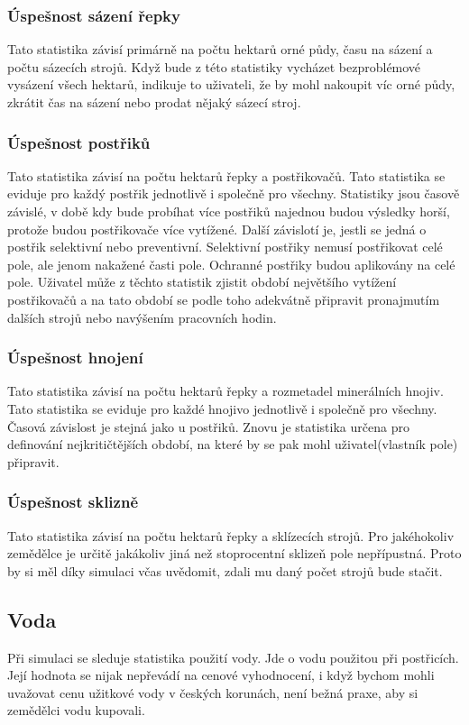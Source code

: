 \documentclass[11pt,a4paper,titlepage]{article}
\begin{document}
\subsubsection{Úspešnost sázení řepky}
Tato statistika závisí primárně na počtu hektarů orné půdy, času na sázení a počtu sázecích strojů. Když bude z této statistiky vycházet bezproblémové vysázení všech hektarů, indikuje to uživateli, že by mohl nakoupit víc orné půdy, zkrátit čas na sázení nebo prodat nějaký sázecí stroj.
\subsubsection{Úspešnost postřiků}
Tato statistika závisí na počtu hektarů řepky a postřikovačů. Tato statistika se eviduje pro každý postřik jednotlivě i společně pro všechny. Statistiky jsou časově závislé, v době kdy bude probíhat více postřiků najednou budou výsledky horší, protože budou postřikovače více vytížené. Další závislotí je, jestli se jedná o postřik selektivní nebo preventivní. Selektivní postřiky nemusí postřikovat celé pole, ale jenom nakažené časti pole. Ochranné postřiky budou aplikovány na celé pole. Uživatel může z těchto statistik zjistit období největšího vytížení postřikovačů a na tato období se podle toho adekvátně připravit pronajmutím dalších strojů nebo navýšením pracovních hodin.
\subsubsection{Úspešnost hnojení}
Tato statistika závisí na počtu hektarů řepky a rozmetadel minerálních hnojiv. Tato statistika se eviduje pro každé hnojivo jednotlivě i společně pro všechny. Časová závislost je stejná jako u postřiků. Znovu je statistika určena pro definování nejkritičtějších období, na které by se pak mohl uživatel(vlastník pole) připravit.
\subsubsection{Úspešnost sklizně}
Tato statistika závisí na počtu hektarů řepky a sklízecích strojů. Pro jakéhokoliv zemědělce je určitě jakákoliv jiná než stoprocentní sklizeň pole nepřípustná. Proto by si měl díky simulaci včas uvědomit, zdali mu daný počet strojů bude stačit.
\subsection{Voda}
Při simulaci se sleduje statistika použití vody. Jde o vodu použitou při postřicích. Její hodnota se nijak nepřevádí na cenové vyhodnocení, i když bychom mohli uvažovat cenu užitkové vody v českých korunách, není bežná praxe, aby si zemědělci vodu kupovali.
\end{document}
